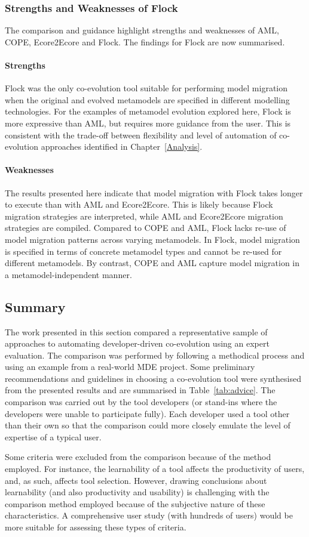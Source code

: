 \subsubsection{Strengths and Weaknesses of Flock}
The comparison and guidance highlight strengths and weaknesses of AML, COPE, Ecore2Ecore and Flock. The findings for Flock are now summarised.

\paragraph{Strengths} Flock was the only co-evolution tool suitable for performing model migration when the original and evolved metamodels are specified in different modelling technologies. For the examples of metamodel evolution explored here, Flock is more expressive than AML, but requires more guidance from the user. This is consistent with the trade-off between flexibility and level of automation of co-evolution approaches identified in Chapter~\ref{Analysis}.

\paragraph{Weaknesses} The results presented here indicate that model migration with Flock takes longer to execute than with AML and Ecore2Ecore. This is likely because Flock migration strategies are interpreted, while AML and Ecore2Ecore migration strategies are compiled. Compared to COPE and AML, Flock lacks re-use of model migration patterns across varying metamodels. In Flock, model migration is specified in terms of concrete metamodel types and cannot be re-used for different metamodels. By contrast, COPE and AML capture model migration in a metamodel-independent manner. 

\subsection{Summary}
The work presented in this section compared a representative sample of approaches to automating developer-driven co-evolution using an expert evaluation. The comparison was performed by following a methodical process and using an example from a real-world MDE project. Some preliminary recommendations and guidelines in choosing a co-evolution tool were synthesised from the presented results and are summarised in Table~\ref{tab:advice}. The comparison was carried out by the tool developers (or stand-ins where the developers were unable to participate fully). Each developer used a tool other than their own so that the comparison could more closely emulate the level of expertise of a typical user.

Some criteria were excluded from the comparison because of the method employed. For instance, the learnability of a tool affects the productivity of users, and, as such, affects tool selection. However, drawing conclusions about learnability (and also productivity and usability) is challenging with the comparison method employed because of the subjective nature of these characteristics. A comprehensive user study (with hundreds of users) would be more suitable for assessing these types of criteria.
